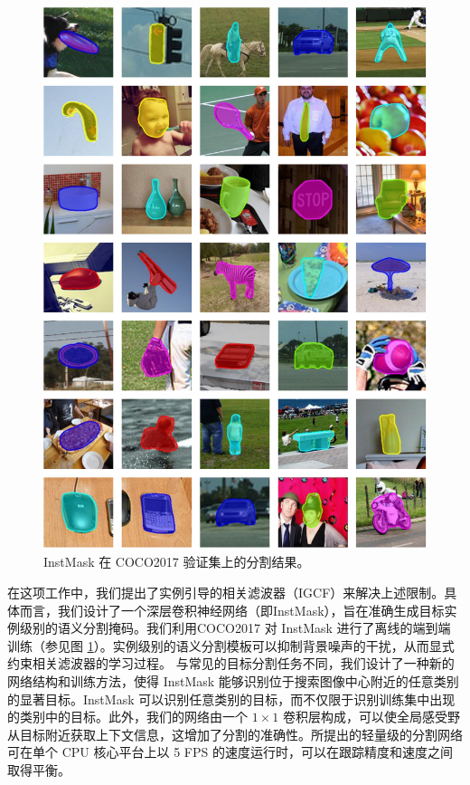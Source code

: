 \begin{figure}
\centering
\includegraphics[width=1.0\textwidth]{Img/IGCF/coco.pdf}
\caption{InstMask 在 COCO2017 \cite{COCO} 验证集上的分割结果。}
\label{fig:InstMask}
\end{figure}

在这项工作中，我们提出了实例引导的相关滤波器（IGCF）来解决上述限制。具体而言，我们设计了一个深层卷积神经网络（即InstMask），旨在准确生成目标实例级别的语义分割掩码。我们利用COCO2017 \cite{COCO} 对 InstMask 进行了离线的端到端训练（参见图 \ref{fig:InstMask}）。实例级别的语义分割模板可以抑制背景噪声的干扰，从而显式约束相关滤波器的学习过程。
与常见的目标分割任务不同，我们设计了一种新的网络结构和训练方法，使得 InstMask 能够识别位于搜索图像中心附近的任意类别的显著目标。InstMask 可以识别任意类别的目标，而不仅限于识别训练集中出现的类别中的目标。此外，我们的网络由一个 $1 \times 1$ 卷积层构成，可以使全局感受野从目标附近获取上下文信息，这增加了分割的准确性。所提出的轻量级的分割网络可在单个 CPU 核心平台上以 5 FPS 的速度运行时，可以在跟踪精度和速度之间取得平衡。

